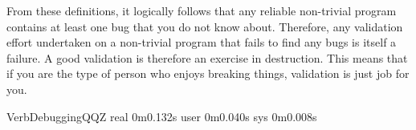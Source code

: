 From these definitions, it logically follows that any reliable
non-trivial program contains at least one bug that you do not
know about.
Therefore, any validation effort undertaken on a non-trivial program
that fails to find any bugs is itself a failure.
A good validation is therefore an exercise in destruction.
This means that if you are the type of person who enjoys breaking things,
validation is just job for you.

\begin{SaveVerbatim}{VerbDebuggingQQZ}
        real    0m0.132s
        user    0m0.040s
        sys     0m0.008s
\end{SaveVerbatim}


